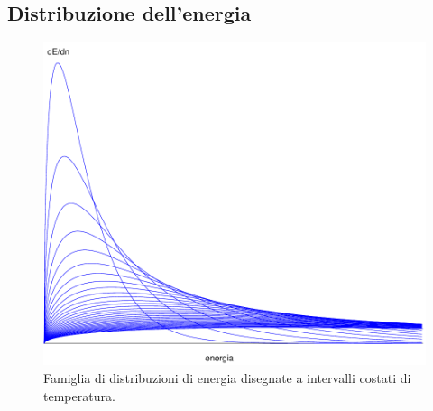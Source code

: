 \subsection{Distribuzione dell'energia}
\begin{figure}[htbp]
   \centering
   \includegraphics[scale=0.7]{immagini/fisica1/energia_max}
   \caption{Famiglia di distribuzioni di energia disegnate a intervalli costati di temperatura.}
\end{figure}

